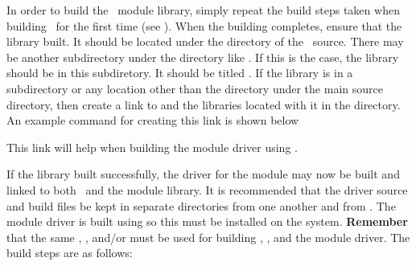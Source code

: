 
In order to build the \icofoam\, module library, simply repeat the build steps taken when building \openfoamex\, for the first time (see ). When the  building completes, ensure that the \icofoam\, library built. It should be located under the  directory of the \openfoamex\, source. There may be another subdirectory under the  directory like . If this is the case, the library should be in this subdiretory. It should be titled . If the library is in a subdirectory or any location other than the  directory under the main source directory, then create a link to  and the libraries located with it in the  directory. An example command for creating this link is shown below


This link will help when building the module driver using .

If the library built successfully, the driver for the module may now be built and linked to both \impact\, and the module library. It is recommended that the driver source and build files be kept in separate directories from one another and from \openfoamex. The module driver is built using  so this must be installed on the system. \textbf{Remember} that the same , , and/or  must be used for building \openfoam, \impact, and the module driver. The build steps are as follows:

